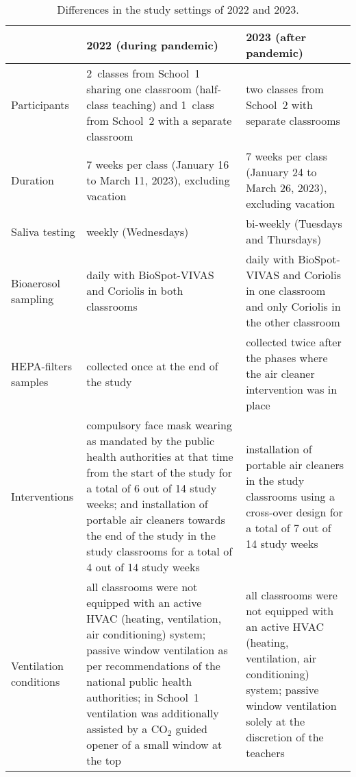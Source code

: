 \documentclass[fleqn,11pt]{wlscirep_supp}
\begin{document}
\newpage

\appendix

\begin{table}[!htpb]
    \caption{Differences in the study settings of 2022 and 2023.}
    \label{tab:comp_study}
    \centering
    \renewcommand{\arraystretch}{1.5}
    \begin{tabular}{lp{6cm}p{6cm}}
        \toprule
        & \textbf{2022 (during pandemic)} & \textbf{2023 (after pandemic)} \\
        \midrule
        Participants & 2~classes from School~1 sharing one classroom (half-class teaching) and 1~class from School~2 with a separate classroom & two classes from School~2 with separate classrooms \\
        Duration & 7 weeks per class (January 16 to March 11, 2023), excluding vacation & 7 weeks per class (January 24 to March 26, 2023), excluding vacation \\
        Saliva testing & weekly (Wednesdays) & bi-weekly (Tuesdays and Thursdays) \\
        Bioaerosol sampling & daily with BioSpot-VIVAS and Coriolis in both classrooms & daily with BioSpot-VIVAS and Coriolis in one classroom and only Coriolis in the other classroom \\
        HEPA-filters samples & collected once at the end of the study & collected twice after the phases where the air cleaner intervention was in place \\
        Interventions & compulsory face mask wearing as mandated by the public health authorities at that time from the start of the study for a total of 6 out of 14 study weeks; and installation of portable air cleaners towards the end of the study in the study classrooms for a total of 4 out of 14 study weeks & installation of portable air cleaners in the study classrooms using a cross-over design for a total of 7 out of 14 study weeks\\
        Ventilation conditions & all classrooms were not equipped with an active HVAC (heating, ventilation, air conditioning) system; passive window ventilation as per recommendations of the national public health authorities; in School~1 ventilation was additionally assisted by a CO$_2$ guided opener of a small window at the top  & all classrooms were not equipped with an active HVAC (heating, ventilation, air conditioning) system; passive window ventilation solely at the discretion of the teachers \\
        \bottomrule
    \end{tabular}
\end{table}
\end{document}
